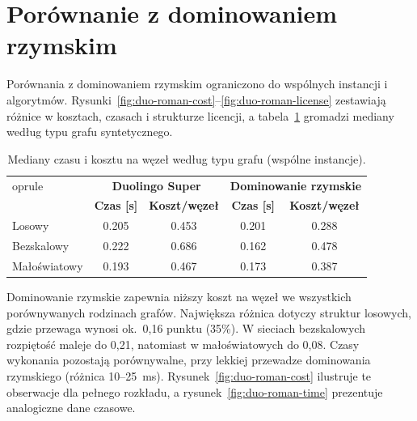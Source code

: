 \section{Porównanie z dominowaniem rzymskim}

Porównania z dominowaniem rzymskim ograniczono do wspólnych instancji i algorytmów. Rysunki~\ref{fig:duo-roman-cost}--\ref{fig:duo-roman-license} zestawiają różnice w kosztach, czasach i strukturze licencji, a tabela~\ref{tab:duo-roman-graph} gromadzi mediany według typu grafu syntetycznego.

\begin{table}[H]
  \centering
  \caption{Mediany czasu i kosztu na węzeł według typu grafu (wspólne instancje).}
  \label{tab:duo-roman-graph}
  \begin{tabular}{lcccc}
    oprule
    \multirow{2}{*}{\textbf{Typ grafu}} & \multicolumn{2}{c}{\textbf{Duolingo Super}} & \multicolumn{2}{c}{\textbf{Dominowanie rzymskie}}                                            \\
                                        & \textbf{Czas [s]}                           & \textbf{Koszt/węzeł}                              & \textbf{Czas [s]} & \textbf{Koszt/węzeł} \\
    \midrule
    Losowy                              & 0.205                                       & 0.453                                             & 0.201             & 0.288                \\
    Bezskalowy                          & 0.222                                       & 0.686                                             & 0.162             & 0.478                \\
    Małoświatowy                        & 0.193                                       & 0.467                                             & 0.173             & 0.387                \\
    \bottomrule
  \end{tabular}
\end{table}

Dominowanie rzymskie zapewnia niższy koszt na węzeł we wszystkich porównywanych rodzinach grafów. Największa różnica dotyczy struktur losowych, gdzie przewaga wynosi ok.~0,16 punktu (35\%). W sieciach bezskalowych rozpiętość maleje do 0,21, natomiast w małoświatowych do 0,08. Czasy wykonania pozostają porównywalne, przy lekkiej przewadze dominowania rzymskiego (różnica 10--25~ms). Rysunek~\ref{fig:duo-roman-cost} ilustruje te obserwacje dla pełnego rozkładu, a rysunek~\ref{fig:duo-roman-time} prezentuje analogiczne dane czasowe.

